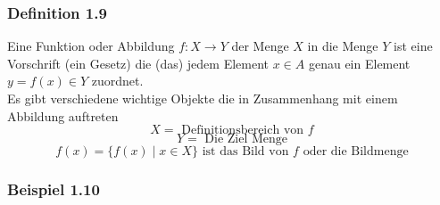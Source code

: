 \subsubsection*{Definition 1.9}
Eine Funktion oder Abbildung $f:X\rightarrow Y$ der Menge $X$ in die Menge $Y$ ist eine Vorschrift (ein Gesetz) die (das) jedem Element $x\in A$ genau ein Element $y=f(x)\in Y$ zuordnet. \\

Es gibt verschiedene wichtige Objekte die in Zusammenhang mit einem Abbildung auftreten 
$$X= \text{ Definitionsbereich von } f$$
$$Y= \text{ Die Ziel Menge}$$
$$f(x)=\{f(x)\mid x\in X\}\text{ ist das Bild von }f\text{ oder die Bildmenge}$$
\subsubsection*{Beispiel 1.10}
